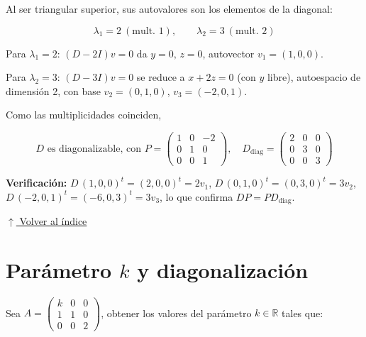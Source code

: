 \documentclass[12pt]{article}
\newcommand{\volverindice}{%
    \vspace{1em}%
    \begin{flushright}%
        \hyperlink{indice}{\small $\uparrow$ Volver al índice}%
    \end{flushright}%
}
\begin{document}
\begin{enumerate}[label=\alph*.-]
    Al ser triangular superior, sus autovalores son los elementos de
    la diagonal:

    \[
    \boxed{\lambda_1=2\ (\text{mult. } 1), \qquad \lambda_2=3\ (\text{mult. } 2)}
    \]

    Para $\lambda_1=2$: $(D-2I)v=0$ da $y=0,\,z=0$, autovector
    $v_1=(1,0,0)$.

    Para $\lambda_2=3$: $(D-3I)v=0$ se reduce a $x+2z=0$ (con $y$
    libre), autoespacio de dimensión 2, con base $v_2=(0,1,0)$,
    $v_3=(-2,0,1)$.

    Como las multiplicidades coinciden,

    \[
    \boxed{D \text{ es diagonalizable, con } P=\begin{pmatrix}1&0&-2\\0&1&0\\0&0&1\end{pmatrix},
    \quad D_{\text{diag}}=\begin{pmatrix}2&0&0\\0&3&0\\0&0&3\end{pmatrix}}
    \]

    \textbf{Verificación:}
    $D\,(1,0,0)^{t}=(2,0,0)^t=2v_1$,
    $D\,(0,1,0)^t=(0,3,0)^t=3v_2$,
    $D\,(-2,0,1)^t=(-6,0,3)^t=3v_3$, lo que confirma $DP=PD_{\text{diag}}$.

\end{enumerate}

\volverindice
\newpage


\section{Parámetro \texorpdfstring{$k$}{k} y diagonalización}

Sea $A=\begin{pmatrix}k&0&0\\1&1&0\\0&0&2\end{pmatrix}$, obtener los
valores del parámetro $k\in\mathbb{R}$ tales que:
\end{document}

